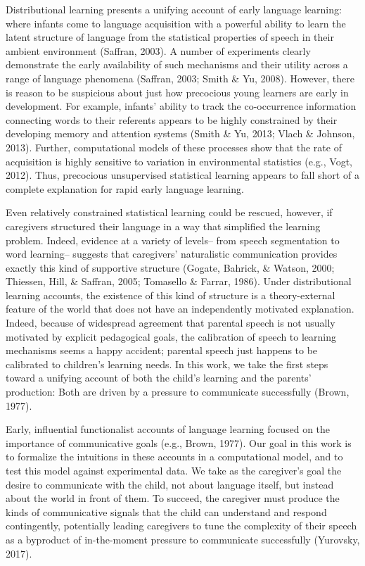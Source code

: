 \documentclass[10pt, letterpaper]{article}
\begin{document}
Distributional learning presents a unifying account of early language
learning: where infants come to language acquisition with a powerful
ability to learn the latent structure of language from the statistical
properties of speech in their ambient environment (Saffran, 2003). A
number of experiments clearly demonstrate the early availability of such
mechanisms and their utility across a range of language phenomena
(Saffran, 2003; Smith \& Yu, 2008). However, there is reason to be
suspicious about just how precocious young learners are early in
development. For example, infants' ability to track the co-occurrence
information connecting words to their referents appears to be highly
constrained by their developing memory and attention systems (Smith \&
Yu, 2013; Vlach \& Johnson, 2013). Further, computational models of
these processes show that the rate of acquisition is highly sensitive to
variation in environmental statistics (e.g., Vogt, 2012). Thus,
precocious unsupervised statistical learning appears to fall short of a
complete explanation for rapid early language learning.

Even relatively constrained statistical learning could be rescued,
however, if caregivers structured their language in a way that
simplified the learning problem. Indeed, evidence at a variety of
levels-- from speech segmentation to word learning-- suggests that
caregivers' naturalistic communication provides exactly this kind of
supportive structure (Gogate, Bahrick, \& Watson, 2000; Thiessen, Hill,
\& Saffran, 2005; Tomasello \& Farrar, 1986). Under distributional
learning accounts, the existence of this kind of structure is a
theory-external feature of the world that does not have an independently
motivated explanation. Indeed, because of widespread agreement that
parental speech is not usually motivated by explicit pedagogical goals,
the calibration of speech to learning mechanisms seems a happy accident;
parental speech just happens to be calibrated to children's learning
needs. In this work, we take the first steps toward a unifying account
of both the child's learning and the parents' production: Both are
driven by a pressure to communicate successfully (Brown, 1977).

Early, influential functionalist accounts of language learning focused
on the importance of communicative goals (e.g., Brown, 1977). Our goal
in this work is to formalize the intuitions in these accounts in a
computational model, and to test this model against experimental data.
We take as the caregiver's goal the desire to communicate with the
child, not about language itself, but instead about the world in front
of them. To succeed, the caregiver must produce the kinds of
communicative signals that the child can understand and respond
contingently, potentially leading caregivers to tune the complexity of
their speech as a byproduct of in-the-moment pressure to communicate
successfully (Yurovsky, 2017).
\end{document}
